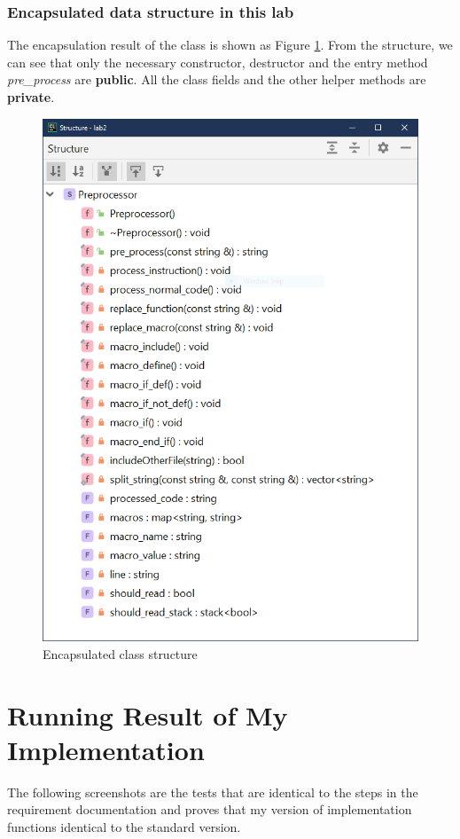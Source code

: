 \documentclass[a4paper]{report}
\begin{document}
\subsection{Encapsulated data structure in this lab}
The encapsulation result of the class is shown as Figure \ref{2}. From the structure, we can see that only the necessary constructor, destructor and the entry method \emph{pre\_process} are \textbf{public}. All the class fields and the other helper methods are \textbf{private}.
\begin{figure}
  \centering
  \includegraphics[scale=0.6]{structure.png}
  \caption{Encapsulated class structure}\label{2}
\end{figure}
\chapter{Running Result of My Implementation}
The following screenshots are the tests that are identical to the steps in the requirement documentation and proves that my version of implementation functions identical to the standard version.
\end{document}
